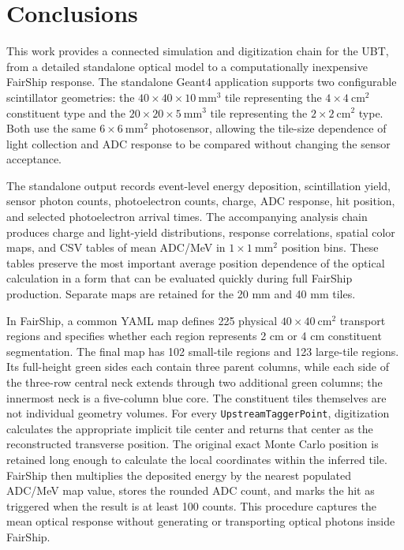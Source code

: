 \section{Conclusions}
\label{sec:conclusions}

This work provides a connected simulation and digitization chain for the UBT,
from a detailed standalone optical model to a computationally inexpensive
FairShip response.  The standalone Geant4 application supports two
configurable scintillator geometries: the \(40\times40\times10~\mathrm{mm^3}\)
tile representing the \(4\times4~\mathrm{cm^2}\) constituent type and the
\(20\times20\times5~\mathrm{mm^3}\) tile representing the
\(2\times2~\mathrm{cm^2}\) type.  Both use the same
\(6\times6~\mathrm{mm^2}\) photosensor, allowing the tile-size dependence of
light collection and ADC response to be compared without changing the sensor
acceptance.

The standalone output records event-level energy deposition, scintillation
yield, sensor photon counts, photoelectron counts, charge, ADC response, hit
position, and selected photoelectron arrival times.  The accompanying
analysis chain produces charge and light-yield distributions, response
correlations, spatial color maps, and CSV tables of mean ADC/MeV in
\(1\times1~\mathrm{mm^2}\) position bins.  These tables preserve the most
important average position dependence of the optical calculation in a form
that can be evaluated quickly during full FairShip production.  Separate maps
are retained for the 20 mm and 40 mm tiles.

In FairShip, a common YAML map defines 225 physical
\(40\times40~\mathrm{cm^2}\) transport regions and specifies whether each
region represents 2 cm or 4 cm constituent segmentation.  The final map has
102 small-tile regions and 123 large-tile regions.  Its full-height green
sides each contain three parent columns, while each side of the three-row
central neck extends through two additional green columns; the innermost
neck is a five-column blue core.  The constituent tiles themselves are not
individual geometry volumes.  For every
\texttt{UpstreamTaggerPoint}, digitization calculates the appropriate
implicit tile center and returns that center as the reconstructed transverse
position.  The original exact Monte Carlo position is retained long enough
to calculate the local coordinates within the inferred tile.  FairShip then
multiplies the deposited energy by the nearest populated ADC/MeV map value,
stores the rounded ADC count, and marks the hit as triggered when the result
is at least 100 counts.  This procedure captures the mean optical response
without generating or transporting optical photons inside FairShip.

